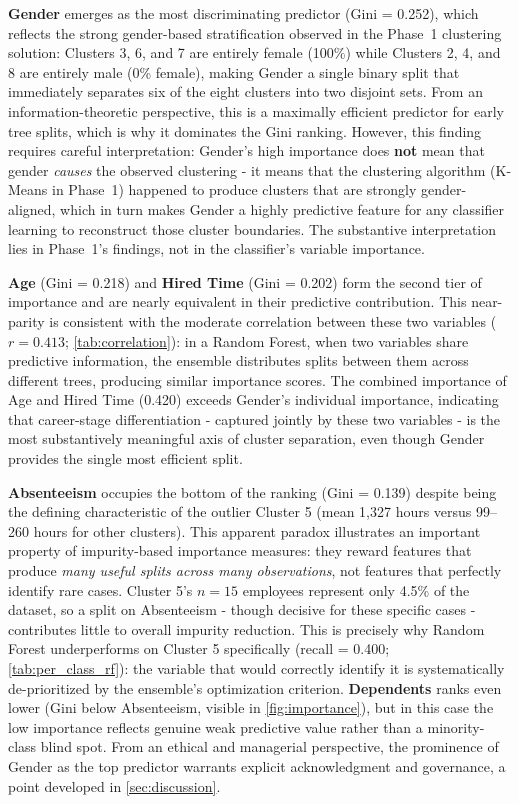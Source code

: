 \documentclass[alpha-refs,english]{RBCA_v3.0}
\begin{document}
\textbf{Gender} emerges as the most discriminating predictor (Gini = 0.252), 
which reflects the strong gender-based stratification observed in the Phase~1 
clustering solution: Clusters 3, 6, and 7 are entirely female (100\%) while 
Clusters 2, 4, and 8 are entirely male (0\% female), making Gender a single 
binary split that immediately separates six of the eight clusters into two 
disjoint sets. From an information-theoretic perspective, this is a 
maximally efficient predictor for early tree splits, which is why it 
dominates the Gini ranking. However, this finding requires careful 
interpretation: Gender's high importance does \textbf{not} mean that gender 
\textit{causes} the observed clustering - it means that the clustering 
algorithm (K-Means in Phase~1) happened to produce clusters that are 
strongly gender-aligned, which in turn makes Gender a highly predictive 
feature for any classifier learning to reconstruct those cluster boundaries. 
The substantive interpretation lies in Phase~1's findings, not in the 
classifier's variable importance.

\textbf{Age} (Gini = 0.218) and \textbf{Hired Time} (Gini = 0.202) form the 
second tier of importance and are nearly equivalent in their predictive 
contribution. This near-parity is consistent with the moderate correlation 
between these two variables ($r = 0.413$; \cref{tab:correlation}): in a 
Random Forest, when two variables share predictive information, the ensemble 
distributes splits between them across different trees, producing similar 
importance scores. The combined importance of Age and Hired Time (0.420) exceeds 
Gender's individual importance, indicating that career-stage 
differentiation - captured jointly by these two variables - is the most 
substantively meaningful axis of cluster separation, even though Gender 
provides the single most efficient split.

\textbf{Absenteeism} occupies the bottom of the ranking (Gini = 0.139) 
despite being the defining characteristic of the outlier Cluster 5 (mean 
1,327 hours versus 99--260 hours for other clusters). This apparent paradox 
illustrates an important property of impurity-based importance measures: 
they reward features that produce \textit{many useful splits across many 
observations}, not features that perfectly identify rare cases. Cluster 5's 
$n=15$ employees represent only 4.5\% of the dataset, so a split on 
Absenteeism - though decisive for these specific cases - contributes 
little to overall impurity reduction. This is precisely why Random Forest 
underperforms on Cluster 5 specifically (recall = 0.400; 
\cref{tab:per_class_rf}): the variable that would correctly identify it is 
systematically de-prioritized by the ensemble's optimization criterion. 
\textbf{Dependents} ranks even lower (Gini below Absenteeism, visible in 
\cref{fig:importance}), but in this case the low importance reflects genuine 
weak predictive value rather than a minority-class blind spot. From an 
ethical and managerial perspective, the prominence of Gender as the top 
predictor warrants explicit acknowledgment and governance, a point developed 
in \cref{sec:discussion}.
\end{document}
